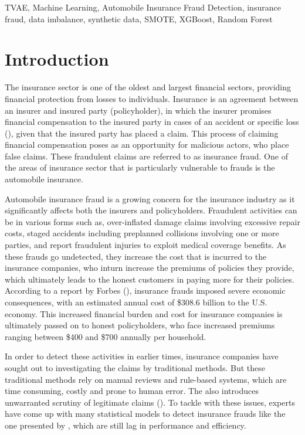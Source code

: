 \documentclass[twoside,11pt]{article}
\begin{document}
\begin{keywords}
TVAE, Machine Learning, Automobile Insurance Fraud Detection, insurance fraud, data imbalance, synthetic data, SMOTE, XGBoost, Random Forest
\end{keywords}



\section{Introduction} 
The insurance sector is one of the oldest and largest financial sectors, providing financial protection from losses to individuals. Insurance is an agreement between an insurer and insured party (policyholder), in which the insurer promises financial compensation to the insured party in cases of an accident or specific loss (\citealp{viaeneInsuranceFraudIssues2004}), given that the insured party has placed a claim. This process of claiming financial compensation poses as an opportunity for malicious actors, who place false claims. These fraudulent claims are referred to as insurance fraud. One of the areas of insurance sector that is particularly vulnerable to frauds is the automobile insurance.

Automobile insurance fraud is a growing concern for the insurance industry as it significantly affects both the insurers and policyholders. Fraudulent activities can be in various forms such as, over-inflated damage claims involving excessive repair costs, staged accidents including preplanned collisions involving one or more parties, and report fraudulent injuries to exploit medical coverage benefits. As these frauds go undetected, they increase the cost that is incurred to the insurance companies, who inturn increase the premiums of policies they provide, which ultimately leads to the honest customers in paying more for their policies. According to a report by Forbes (\citealp{kilroyInsuranceFraudStatistics2024}), insurance frauds imposed severe economic consequences, with an estimated annual cost of \$308.6 billion to the U.S. economy. This increased financial burden and cost for insurance companies is ultimately passed on to honest policyholders, who face increased premiums ranging between \$400 and \$700 annually per household.

In order to detect these activities in earlier times, insurance companies have sought out to investigating the claims by traditional methods. But these traditional methods rely on manual reviews and rule-based systems, which are time consuming, costly and prone to human error. The also introduces unwarranted scrutiny of legitimate claims (\citealp{AndreasRp,BERMUDEZ}). To tackle with these issues, experts have come up with many statistical models to detect insurance frauds like the one presented by \citealp{belhadjiModelDetectionInsurance2000}, which are still lag in performance and efficiency. 
\end{document}
